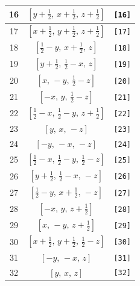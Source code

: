 \documentclass[fleqn,8pt]{jsarticle}
\begin{document}
\begin{longtable}{ccc}
16 & $\left[ y + \frac{1}{2},\, x + \frac{1}{2},\, z + \frac{1}{2} \right]$ & {\tt [16]} \\ \hline
17 & $\left[ x + \frac{1}{2},\, y + \frac{1}{2},\, z + \frac{1}{2} \right]$ & {\tt [17]} \\ \hline
18 & $\left[ \frac{1}{2} - y,\, x + \frac{1}{2},\, z \right]$ & {\tt [18]} \\ \hline
19 & $\left[ y + \frac{1}{2},\, \frac{1}{2} - x,\, z \right]$ & {\tt [19]} \\ \hline
20 & $\left[ x,\, - y,\, \frac{1}{2} - z \right]$ & {\tt [20]} \\ \hline
21 & $\left[ - x,\, y,\, \frac{1}{2} - z \right]$ & {\tt [21]} \\ \hline
22 & $\left[ \frac{1}{2} - x,\, \frac{1}{2} - y,\, z + \frac{1}{2} \right]$ & {\tt [22]} \\ \hline
23 & $\left[ y,\, x,\, - z \right]$ & {\tt [23]} \\ \hline
24 & $\left[ - y,\, - x,\, - z \right]$ & {\tt [24]} \\ \hline
25 & $\left[ \frac{1}{2} - x,\, \frac{1}{2} - y,\, \frac{1}{2} - z \right]$ & {\tt [25]} \\ \hline
26 & $\left[ y + \frac{1}{2},\, \frac{1}{2} - x,\, - z \right]$ & {\tt [26]} \\ \hline
27 & $\left[ \frac{1}{2} - y,\, x + \frac{1}{2},\, - z \right]$ & {\tt [27]} \\ \hline
28 & $\left[ - x,\, y,\, z + \frac{1}{2} \right]$ & {\tt [28]} \\ \hline
29 & $\left[ x,\, - y,\, z + \frac{1}{2} \right]$ & {\tt [29]} \\ \hline
30 & $\left[ x + \frac{1}{2},\, y + \frac{1}{2},\, \frac{1}{2} - z \right]$ & {\tt [30]} \\ \hline
31 & $\left[ - y,\, - x,\, z \right]$ & {\tt [31]} \\ \hline
32 & $\left[ y,\, x,\, z \right]$ & {\tt [32]} \\
\end{longtable}
\end{document}
